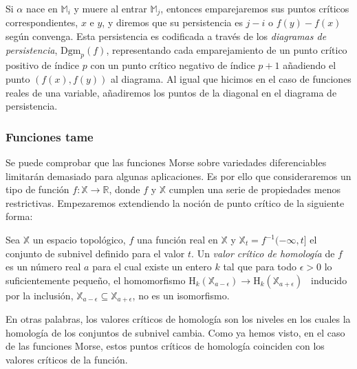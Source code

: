 Si $\alpha$ nace en $\mathbb{M}_i$ y muere al entrar $\mathbb{M}_j$, entonces emparejaremos sus puntos críticos correspondientes, $x$ e $y$, y diremos que su persistencia es $j-i$ o $f(y)-f(x)$ según convenga. Esta persistencia es codificada a través de los \emph{diagramas de persistencia}, $\text{Dgm}_p(f)$, representando cada emparejamiento de un punto crítico positivo de índice $p$ con un punto crítico negativo de índice $p+1$ añadiendo el punto $(f(x),f(y))$ al diagrama. Al igual que hicimos en el caso de funciones reales de una variable, añadiremos los puntos de la diagonal en el diagrama de persistencia.

\subsubsection*{Funciones tame}
Se puede comprobar que las funciones Morse sobre variedades diferenciables limitarán demasiado para algunas aplicaciones. Es por ello que consideraremos un tipo de función $f: \mathbb{X} \to \mathbb{R}$, donde $f$ y $\mathbb{X}$ cumplen una serie de propiedades menos restrictivas. Empezaremos extendiendo la noción de punto crítico de la siguiente forma:

\begin{definition}
\begin{sloppypar}
Sea $\mathbb{X}$ un espacio topológico, $f$ una función real en $\mathbb{X}$ y ${\mathbb{X}_t=f^{-1}(-\infty, t]}$ el conjunto de subnivel definido para el valor $t$. Un \emph{valor crítico de homología} de $f$ es un número real $a$ para el cual existe un entero $k$ tal que para todo $\epsilon > 0$ lo suficientemente pequeño, el homomorfismo $\text{H}_k(\mathbb{X}_{a-\epsilon}) \to \text{H}_k(\mathbb{X}_{a+\epsilon})$ \footnotemark \ inducido por la inclusión, $\mathbb{X}_{a-\epsilon} \subseteq \mathbb{X}_{a+\epsilon}$, no es un isomorfismo.
\end{sloppypar}
\end{definition}


En otras palabras, los valores críticos de homología son los niveles en los cuales la homología de los conjuntos de subnivel cambia. Como ya hemos visto, en el caso de las funciones Morse, estos puntos críticos de homología coinciden con los valores críticos de la función.

